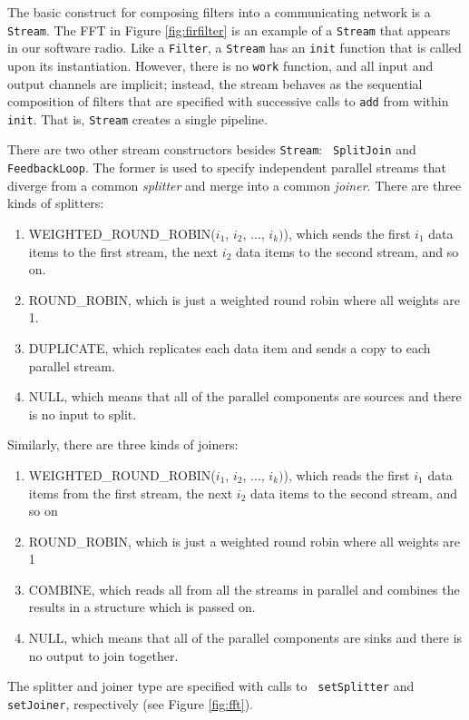 The basic construct for composing filters into a communicating network
is a {\tt Stream}.  The FFT in Figure \ref{fig:firfilter} is an
example of a {\tt Stream} that appears in our software radio.  Like a
{\tt Filter}, a {\tt Stream} has an {\tt init} function that is called
upon its instantiation.  However, there is no {\tt work} function, and
all input and output channels are implicit; instead, the stream
behaves as the sequential composition of filters that are specified
with successive calls to {\tt add} from within {\tt init}.  That is,
{\tt Stream} creates a single pipeline.

There are two other stream constructors besides {\tt Stream}: {\tt
SplitJoin} and {\tt FeedbackLoop}.  The former is used to specify
independent parallel streams that diverge from a common {\it splitter}
and merge into a common {\it joiner}.  There are three kinds of
splitters:
\begin{enumerate}
\item WEIGHTED\_ROUND\_ROBIN($i_1$, $i_2$, $\dots$, $i_k)$),
which sends the first $i_1$ data items to the first stream, the next
$i_2$ data items to the second stream, and so on.
\item ROUND\_ROBIN, which is just a weighted round robin where all
weights are 1.
\item DUPLICATE, which replicates each data item and sends a copy to each
parallel stream.
\item NULL, which means that all of the parallel components are
sources and there is no input to split.
\end{enumerate}
Similarly, there are three kinds of joiners: 
\begin{enumerate}
\item WEIGHTED\_ROUND\_ROBIN($i_1$, $i_2$, $\dots$, $i_k)$), which reads the
first $i_1$ data items from the first stream, the next $i_2$ data
items to the second stream, and so on
\item ROUND\_ROBIN, which is just a weighted round robin where all
weights are 1
\item COMBINE, which reads all from all the streams in parallel and
combines the results in a structure which is passed on.
\item NULL, which means that all of the parallel components are sinks
and there is no output to join together.
\end{enumerate}
The splitter and joiner type are specified with calls to {\tt
setSplitter} and {\tt setJoiner}, respectively (see Figure \ref{fig:fft}).

